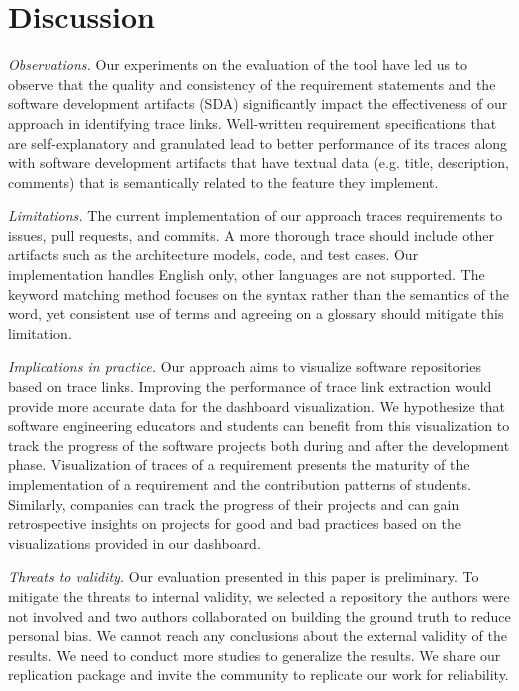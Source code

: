 \section{Discussion}
\label{sec:discuss}

\emph{Observations.} Our experiments on the evaluation of the tool have led us to observe that the quality and consistency of the requirement statements and the software development artifacts (SDA) significantly impact the effectiveness of our approach in identifying trace links. Well-written requirement specifications that are self-explanatory and granulated lead to better performance of its traces along with software development artifacts that have textual data (e.g. title, description, comments) that is semantically related to the feature they implement.

\emph{Limitations.} The current implementation of our approach traces requirements to issues, pull requests, and commits. A more thorough trace should include other artifacts such as the architecture models, code, and test cases. Our implementation handles English only, other languages are not supported. The keyword matching method focuses on the syntax rather than the semantics of the word, yet consistent use of terms and agreeing on a glossary should mitigate this limitation.

\emph{Implications in practice.} Our approach aims to visualize software repositories based on trace links. Improving the performance of trace link extraction would provide more accurate data for the dashboard visualization. We hypothesize that software engineering educators and students can benefit from this visualization to track the progress of the software projects both during and after the development phase. Visualization of traces of a requirement presents the maturity of the implementation of a requirement and the contribution patterns of students. Similarly, companies can track the progress of their projects and can gain retrospective insights on projects for good and bad practices based on the visualizations provided in our dashboard.

\emph{Threats to validity.} Our evaluation presented in this paper is preliminary. To mitigate the threats to internal validity, we selected a repository the authors were not involved and two authors collaborated on building the ground truth to reduce personal bias. We cannot reach any conclusions about the external validity of the results. We need to conduct more studies to generalize the results. We share our replication package and invite the community to replicate our work for reliability.